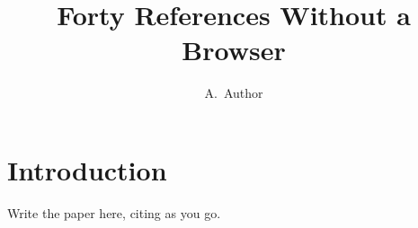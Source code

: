 \documentclass[11pt,a4paper]{article}
\title{Forty References Without a Browser}
\author{A.~Author}
\begin{document}
\maketitle

\section{Introduction}

Write the paper here, citing as you go.



\end{document}
